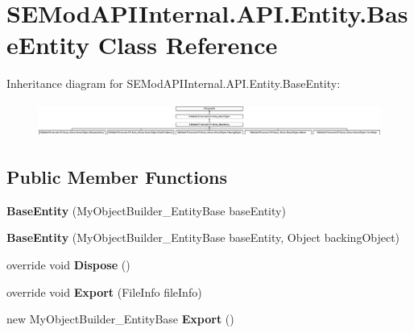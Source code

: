 \hypertarget{class_s_e_mod_a_p_i_internal_1_1_a_p_i_1_1_entity_1_1_base_entity}{}\section{S\+E\+Mod\+A\+P\+I\+Internal.\+A\+P\+I.\+Entity.\+Base\+Entity Class Reference}
\label{class_s_e_mod_a_p_i_internal_1_1_a_p_i_1_1_entity_1_1_base_entity}
Inheritance diagram for S\+E\+Mod\+A\+P\+I\+Internal.\+A\+P\+I.\+Entity.\+Base\+Entity\+:\begin{figure}[H]
\begin{center}
\leavevmode
\includegraphics[height=1.139949cm]{class_s_e_mod_a_p_i_internal_1_1_a_p_i_1_1_entity_1_1_base_entity}
\end{center}
\end{figure}
\subsection*{Public Member Functions}
\begin{DoxyCompactItemize}
\item 
\hypertarget{class_s_e_mod_a_p_i_internal_1_1_a_p_i_1_1_entity_1_1_base_entity_a353f536ec260089fe0bae000a6f537c0}{}{\bfseries Base\+Entity} (My\+Object\+Builder\+\_\+\+Entity\+Base base\+Entity)\label{class_s_e_mod_a_p_i_internal_1_1_a_p_i_1_1_entity_1_1_base_entity_a353f536ec260089fe0bae000a6f537c0}

\item 
\hypertarget{class_s_e_mod_a_p_i_internal_1_1_a_p_i_1_1_entity_1_1_base_entity_aa205dc5f03e56266bee3930bb12ba9c3}{}{\bfseries Base\+Entity} (My\+Object\+Builder\+\_\+\+Entity\+Base base\+Entity, Object backing\+Object)\label{class_s_e_mod_a_p_i_internal_1_1_a_p_i_1_1_entity_1_1_base_entity_aa205dc5f03e56266bee3930bb12ba9c3}

\item 
\hypertarget{class_s_e_mod_a_p_i_internal_1_1_a_p_i_1_1_entity_1_1_base_entity_ac03b03ae88270e4160f9e0431803f138}{}override void {\bfseries Dispose} ()\label{class_s_e_mod_a_p_i_internal_1_1_a_p_i_1_1_entity_1_1_base_entity_ac03b03ae88270e4160f9e0431803f138}

\item 
\hypertarget{class_s_e_mod_a_p_i_internal_1_1_a_p_i_1_1_entity_1_1_base_entity_a16ed1e5e6ed255952670a0d51859a3cf}{}override void {\bfseries Export} (File\+Info file\+Info)\label{class_s_e_mod_a_p_i_internal_1_1_a_p_i_1_1_entity_1_1_base_entity_a16ed1e5e6ed255952670a0d51859a3cf}

\item 
\hypertarget{class_s_e_mod_a_p_i_internal_1_1_a_p_i_1_1_entity_1_1_base_entity_a50889b873fd173d9114205d6c0eed89e}{}new My\+Object\+Builder\+\_\+\+Entity\+Base {\bfseries Export} ()\label{class_s_e_mod_a_p_i_internal_1_1_a_p_i_1_1_entity_1_1_base_entity_a50889b873fd173d9114205d6c0eed89e}

\end{DoxyCompactItemize}
